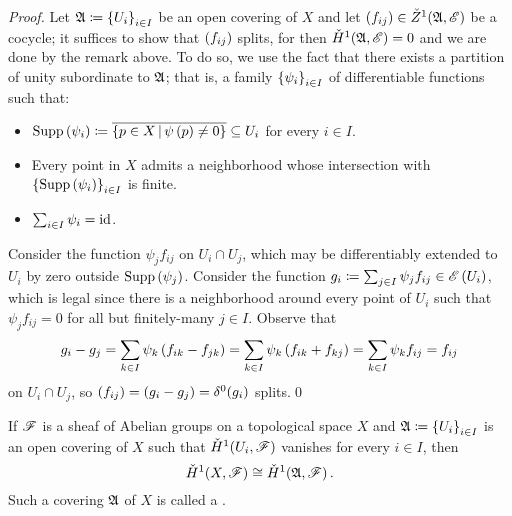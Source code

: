 \documentclass[../Moduli_Spaces_of_Riemann_Surfaces.tex]{subfiles}
\begin{document}
    \begin{proof}
        Let $\mathfrak{A}\coloneqq\left\{U_i\right\}_{i\in I}$ be an open covering of $X$ and let $\left(f_{ij}\right)\in\check{Z}^1\!\left(\mathfrak{A},\mathscr{E}\right)$ be a cocycle; it suffices to show that $\left(f_{ij}\right)$ splits, for then $\check{H}^1\!\left(\mathfrak{A},\mathscr{E}\right)=0$ and we are done by the remark above. To do so, we use the fact that there exists a partition of unity subordinate to $\mathfrak{A}$; that is, a family $\left\{\psi_i\right\}_{i\in I}$ of differentiable functions such that:
        \begin{itemize}
            \item $\operatorname{Supp}\left(\psi_i\right)\coloneqq\overline{\left\{p\in X\,\middle\vert\,\psi\left(p\right)\neq0\right\}}\subseteq U_i$ for every $i\in I$.
                \vspace{-0.05in}
            \item Every point in $X$ admits a neighborhood whose intersection with $\left\{\operatorname{Supp}\left(\psi_i\right)\right\}_{i\in I}$ is finite.
                \vspace{-0.05in}
            \item $\sum_{i\in I}\psi_i=\operatorname{id}$.
        \end{itemize}
        Consider the function $\psi_jf_{ij}$ on $U_i\cap U_j$, which may be differentiably extended to $U_i$ by zero outside $\operatorname{Supp}\left(\psi_j\right)$. Consider the function $g_i\coloneqq\sum_{j\in I}\psi_jf_{ij}\in\mathscr{E}\left(U_i\right)$, which is legal since there is a neighborhood around every point of $U_i$ such that $\psi_jf_{ij}=0$ for all but finitely-many $j\in I$. Observe that
        \begin{equation*}
            g_i-g_j=\sum_{k\in I}\psi_k\left(f_{ik}-f_{jk}\right)=\sum_{k\in I}\psi_k\left(f_{ik}+f_{kj}\right)=\sum_{k\in I}\psi_kf_{ij}=f_{ij}
        \end{equation*}
        on $U_i\cap U_j$, so $\left(f_{ij}\right)=\left(g_i-g_j\right)=\delta^0\!\left(g_i\right)$ splits.\qed
    \end{proof}
    \begin{proposition}[Leray]\label{3.2:prp:leray}
        If $\mathscr{F}$ is a sheaf of Abelian groups on a topological space $X$ and $\mathfrak{A}\coloneqq\left\{U_i\right\}_{i\in I}$ is an open covering of $X$ such that $\check{H}^1\!\left(U_i,\mathscr{F}\right)$ vanishes for every $i\in I$, then
        \begin{equation*}
            \check{H}^1\!\left(X,\mathscr{F}\right)\cong\check{H}^1\!\left(\mathfrak{A},\mathscr{F}\right).
        \end{equation*}
        Such a covering $\mathfrak{A}$ of $X$ is called a .
    \end{proposition}
\end{document}
